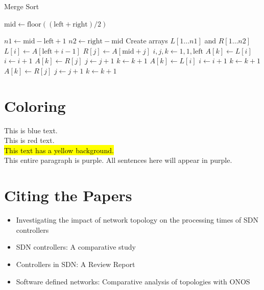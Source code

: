 \documentclass[12pt,a4paper]{article}
\begin{document}
	\begin{algorithm}
		\caption{Merge Sort}
		\begin{algorithmic}[1]
			\State $\text{mid} \gets \text{floor}((\text{left} + \text{right}) / 2)$
			\State {}
			\State {}
			\State {}
			\EndIf
			\EndProcedure
			
			\State $n1 \gets \text{mid} - \text{left} + 1$
			\State $n2 \gets \text{right} - \text{mid}$
			\State Create arrays $L[1 \dots n1]$ and $R[1 \dots n2]$
			\State $L[i] \gets A[\text{left} + i - 1]$
			\EndFor
			\State $R[j] \gets A[\text{mid} + j]$
			\EndFor
			\State $i, j, k \gets 1, 1, \text{left}$
			\State $A[k] \gets L[i]$
			\State $i \gets i + 1$
			\Else
			\State $A[k] \gets R[j]$
			\State $j \gets j + 1$
			\EndIf
			\State $k \gets k + 1$
			\EndWhile
			\State $A[k] \gets L[i]$
			\State $i \gets i + 1$
			\State $k \gets k + 1$
			\EndWhile
			\State $A[k] \gets R[j]$
			\State $j \gets j + 1$
			\State $k \gets k + 1$
			\EndWhile
			\EndProcedure
		\end{algorithmic}
	\end{algorithm}
	
	\newpage 
	\section{Coloring}
	
	{\color{blue} This is blue text.}\\
	{\color{red} This is red text.}\\
	\noindent
	\hl{This text has a yellow background.}\\
	{\color{purple} This entire paragraph is purple. All sentences here will appear in purple.}
	
	\section{Citing the Papers}
	\begin{itemize}
		\item Investigating the impact of network topology on the processing times of SDN controllers \cite{metter2015investigating}
		\item SDN controllers: A comparative study \cite{salman2016sdn}
		\item Controllers in SDN: A Review Report \cite{paliwal2018controllers}
		\item Software defined networks: Comparative analysis of topologies with ONOS \cite{rajaratnam2017software}
	\end{itemize}
	
\end{document}
